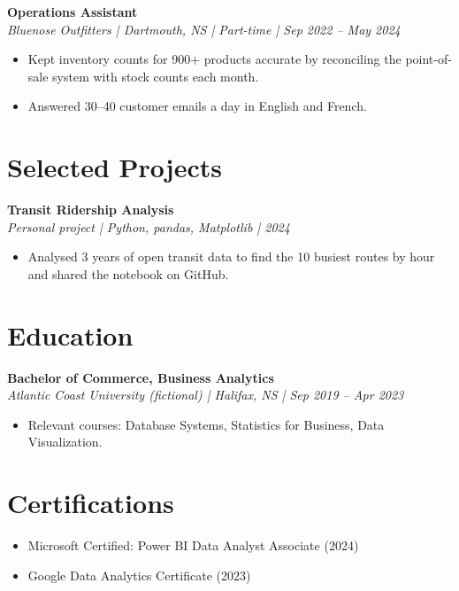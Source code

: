 \documentclass[11pt,letterpaper]{article}
\newcommand{\entry}[2]{\textbf{#1}\\\textit{#2}\par}
\begin{document}
\entry{Operations Assistant}{Bluenose Outfitters | Dartmouth, NS | Part-time | Sep 2022 -- May 2024}
\begin{itemize}
  \item Kept inventory counts for 900+ products accurate by reconciling the point-of-sale system with stock counts each month.
  \item Answered 30--40 customer emails a day in English and French.
\end{itemize}

\section{Selected Projects}
\entry{Transit Ridership Analysis}{Personal project | Python, pandas, Matplotlib | 2024}
\begin{itemize}
  \item Analysed 3 years of open transit data to find the 10 busiest routes by hour and shared the notebook on GitHub.
\end{itemize}

\section{Education}
\entry{Bachelor of Commerce, Business Analytics}{Atlantic Coast University (fictional) | Halifax, NS | Sep 2019 -- Apr 2023}
\begin{itemize}
  \item Relevant courses: Database Systems, Statistics for Business, Data Visualization.
\end{itemize}

\section{Certifications}
\begin{itemize}
  \item Microsoft Certified: Power BI Data Analyst Associate (2024)
  \item Google Data Analytics Certificate (2023)
\end{itemize}
\end{document}
